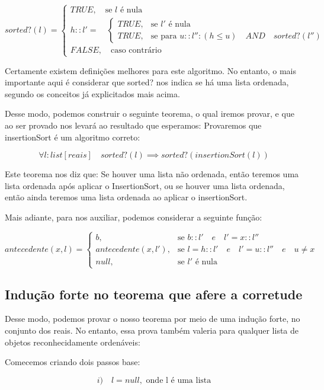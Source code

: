 \documentclass[a4paper, 10pt]{article}
\begin{document}
$$
sorted?(l) = \begin{cases}
TRUE,  \quad \mbox{se } l\mbox{ é nula}\\
h::l' = \quad \begin{cases} 
TRUE, &\mbox{se } l'\mbox{ é nula}\\
TRUE, &\mbox{se para } u::l'': (h \leq u) \quad AND \quad sorted?(l'')
\end{cases}\\
FALSE, \quad \mbox{caso contrário}
\end{cases}
$$

Certamente existem definições melhores para este algoritmo. No entanto, o mais importante aqui é considerar que sorted? nos indica se há uma lista ordenada, segundo os conceitos já explicitados mais acima. 

Desse modo, podemos construir o seguinte teorema, o qual iremos provar, e que ao ser provado nos levará ao resultado que esperamos: Provaremos que insertionSort é um algoritmo correto: 

$$ \forall{l: list[reais]}\quad sorted?(l) \implies sorted?(insertionSort(l)) $$

Este teorema nos diz que: Se houver uma lista não ordenada, então teremos uma lista ordenada após aplicar o InsertionSort, ou se houver uma lista ordenada, então ainda teremos uma lista ordenada ao aplicar o insertionSort. 

Mais adiante, para nos auxiliar, podemos considerar a seguinte função:

$$
antecedente(x, l) = \begin{cases}
b,  &\mbox{se } b::l'\quad  e \quad l' = x::l''\\
antecedente(x, l'), &\mbox{se } l = h::l' \quad e \quad l' = u::l'' \quad e \quad u \neq x \\
null, &\mbox{se } l' \mbox{ é nula} 
\end{cases}
$$

\subsection{Indução forte no teorema que afere a corretude}

Desse modo, podemos provar o nosso teorema por meio de uma indução forte, no conjunto dos reais. No entanto, essa prova também valeria para qualquer lista de objetos reconhecidamente ordenáveis: 

Comecemos criando dois passos base: 

 $$i)\quad l = null, \mbox{ onde l é uma lista} $$
\end{document}
